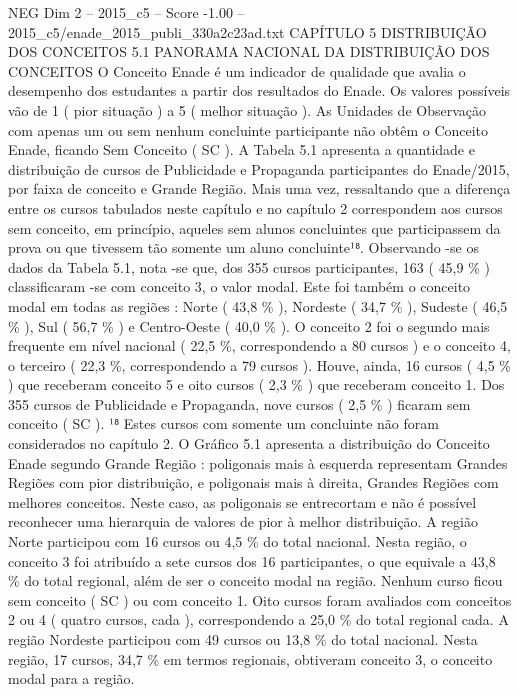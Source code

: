 \begin{textsample}{NEG Dim 2 – 2015\_c5 – Score -1.00 – 2015\_c5/enade\_2015\_publi\_330a2c23ad.txt}  \label{ex:f2_neg_159}
CAPÍTULO 5 DISTRIBUIÇÃO DOS CONCEITOS 5.1 PANORAMA NACIONAL DA DISTRIBUIÇÃO DOS CONCEITOS O Conceito Enade é um indicador de qualidade que avalia o desempenho dos estudantes a partir dos resultados do Enade.
Os valores possíveis vão de 1 ( pior situação ) a 5 ( melhor situação ).
As Unidades de Observação com apenas um ou sem nenhum concluinte participante não obtêm o Conceito Enade, ficando Sem Conceito ( SC ).
A Tabela 5.1 apresenta a quantidade e distribuição de cursos de Publicidade e Propaganda participantes do Enade/2015, por faixa de conceito e Grande Região.
Mais uma vez, ressaltando que a diferença entre os cursos tabulados neste capítulo e no capítulo 2 correspondem aos cursos sem conceito, em princípio, aqueles sem alunos concluintes que participassem da prova ou que tivessem tão somente um aluno concluinte¹⁸.
Observando -se os dados da Tabela 5.1, nota -se que, dos 355 cursos participantes, 163 ( 45,9 \% ) classificaram -se com conceito 3, o valor modal.
Este foi também o conceito modal em todas as regiões : Norte ( 43,8 \% ), Nordeste ( 34,7 \% ), Sudeste ( 46,5 \% ), Sul ( 56,7 \% ) e Centro-Oeste ( 40,0 \% ).
O conceito 2 foi o segundo mais frequente em nível nacional ( 22,5 \%, correspondendo a 80 cursos ) e o conceito 4, o terceiro ( 22,3 \%, correspondendo a 79 cursos ).
Houve, ainda, 16 cursos ( 4,5 \% ) que receberam conceito 5 e oito cursos ( 2,3 \% ) que receberam conceito 1.
Dos 355 cursos de Publicidade e Propaganda, nove cursos ( 2,5 \% ) ficaram sem conceito ( SC ). ¹⁸ Estes cursos com somente um concluinte não foram considerados no capítulo 2.
O Gráfico 5.1 apresenta a distribuição do Conceito Enade segundo Grande Região : poligonais mais à esquerda representam Grandes Regiões com pior distribuição, e poligonais mais à direita, Grandes Regiões com melhores conceitos.
Neste caso, as poligonais se entrecortam e não é possível reconhecer uma hierarquia de valores de pior à melhor distribuição.
A região Norte participou com 16 cursos ou 4,5 \% do total nacional.
Nesta região, o conceito 3 foi atribuído a sete cursos dos 16 participantes, o que equivale a 43,8 \% do total regional, além de ser o conceito modal na região.
Nenhum curso ficou sem conceito ( SC ) ou com conceito 1.
Oito cursos foram avaliados com conceitos 2 ou 4 ( quatro cursos, cada ), correspondendo a 25,0 \% do total regional cada.
A região Nordeste participou com 49 cursos ou 13,8 \% do total nacional.
Nesta região, 17 cursos, 34,7 \% em termos regionais, obtiveram conceito 3, o conceito modal para a região.

\end{textsample}
